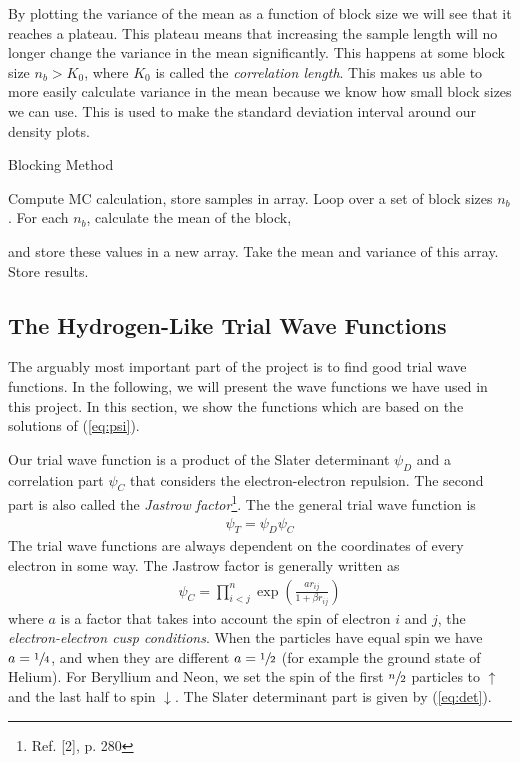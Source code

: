 \documentclass[twocolumns, a4paper,11pt,fleqn]{extarticle}
\newcommand{\eq}[1]{{\small\begin{align*}#1\end{align*}}}
\newcommand{\equ}[1]{{\small\begin{align}#1\end{align}}}
\begin{document}
By plotting the variance of the mean as a function of block size we 
will see that it reaches a plateau.
This plateau means that increasing the sample length will no longer
change the variance in the mean significantly. 
This happens at some block size $n_b > K_0$, 
where $K_0$ is called the \textit{correlation length}. 
This makes us able to more easily calculate variance in the mean because we know how small block sizes we can use. 
This is used to make the standard deviation interval around our density plots. 

\begin{algorithm}[H]
	\caption{Blocking Method}\label{algo:block}
  \begin{algorithmic}[1]
      \State Compute MC calculation, store samples in array.
      \State Loop over a set of block sizes $n_b$.
      \State For each $n_b$, calculate the mean of the block,
      
        and store these values in a new array.
      \State Take the mean and variance of this array.
      \State Store results.
    \EndProcedure
  \end{algorithmic}
\end{algorithm}

\subsection{The Hydrogen-Like Trial Wave Functions}
The arguably most important part of the project is to find good
trial wave functions. In the following, we will present
the wave functions we have used in this project.
In this section, we show the functions which are based on
the solutions of (\ref{eq:psi}).

Our trial wave function is a product of the Slater determinant $\psi_D$ and
a correlation part $\psi_C$ that considers the electron-electron repulsion.
The second part is also called the \textit{Jastrow factor}\footnote{Ref. [2], p. 280}.
The the general trial wave function is
\eq{
  \psi_T = \psi_D \psi_C
}
The trial wave functions are always dependent on the coordinates of every
electron in some way.
The Jastrow factor is generally written as
\equ{
  \psi_C = \prod_{i<j}^{n}\exp{\left(\frac{a r_{ij}}{1+\beta r_{ij}}\right)}
  \label{eq:psicor}
}
where $a$ is a factor that takes into account the spin of electron $i$ and $j$,
the \textit{electron-electron cusp conditions}.
When the particles have equal spin we have $a=\sfrac{1}{4}$,
and when they are different $a=\sfrac{1}{2}$ (for example the ground state of Helium).
For Beryllium and Neon, we set the spin of the first $\sfrac{n}{2}$ particles to
$\uparrow$ and the last half to spin $\downarrow$.
The Slater determinant part is given by (\ref{eq:det}).
\end{document}
